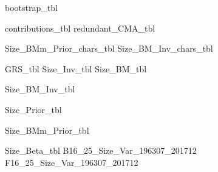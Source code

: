 



\begin{landscape}
{bootstrap_tbl}
\end{landscape}
{contributions_tbl}
{redundant_CMA_tbl}

{Size_BMm_Prior_chars_tbl}
{Size_BM_Inv_chars_tbl}

{GRS_tbl}
{Size_Inv_tbl}
{Size_BM_tbl}
\begin{landscape}
{Size_BM_Inv_tbl}
\end{landscape}
{Size_Prior_tbl}
\begin{landscape}
{Size_BMm_Prior_tbl}
\end{landscape}
{Size_Beta_tbl}
{B16_25_Size_Var_196307_201712}
{F16_25_Size_Var_196307_201712}
